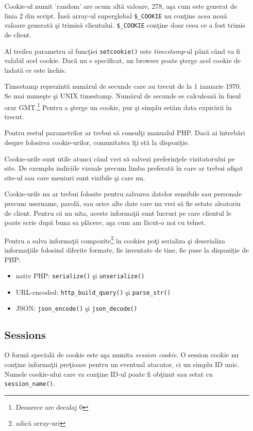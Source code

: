 Cookie-ul numit 'random' are acum altă valoare, 278, aşa cum este generat de linia 2 din script. \^Insă
array-ul superglobal \texttt{\$\_COOKIE} nu conţine acea nouă valoare generată şi trimisă
clientului. \texttt{\$\_COOKIE} conţine doar ceea ce a fost trimis de client.


Al treilea parametru al funcţiei \texttt{setcookie()} este \textsl{timestamp}-ul p\^ană
c\^and va fi valabil acel cookie. Dacă nu e specificat, un browser poate
şterge acel cookie de \^indată ce este \^inchis. 

Timestamp reprezintă numărul de secunde care au trecut de la 1 ianuarie 1970. Se mai numeşte
şi UNIX timestamp. Numărul de secunde se calculează \^in fusul orar GMT.\footnote{Deoarece
are decalaj 0} Pentru a şterge un cookie, pur şi simplu setăm data expirării \^in trecut.

Pentru restul parametrilor ar trebui să consulţi manualul PHP. Dacă ai \^intrebări
despre folosirea cookie-urilor, comunitatea {\phpro} \^iţi stă la dispoziţie.

Cookie-urile sunt utile atunci c\^and vrei să salvezi preferinţele vizitatorului
pe site. De exemplu indiciile vizuale precum limba preferată \^in care ar
trebui afişat site-ul sau care meniuri sunt vizibile şi care nu.

Cookie-urile nu ar trebui folosite pentru salvarea datelor sensibile sau personale
precum username, parolă, sau orice alte date care nu vrei să fie setate aleatoriu
de client. Pentru că nu uita, aceste informaţii sunt lucruri pe care
clientul le poate scrie după buna sa plăcere, aşa cum am făcut-o noi cu telnet.

Pentru a salva informaţii compozite\footnote{adică array-uri} \^in cookies
poţi serializa
şi deserializa informaţiile folosind diferite formate, fie inventate de tine,
fie puse la dispoziţie de PHP:
\begin{itemize}
 \item nativ PHP: \texttt{serialize()} şi \texttt{unserialize()}
 \item URL-encoded: \texttt{http\_build\_query()} şi \texttt{parse\_str()}
 \item JSON: \texttt{json\_encode()} şi \texttt{json\_decode()}
\end{itemize}


\subsection{Sessions}
O formă {\glqq}specială{\grqq} de cookie este aşa numita \textsl{session cookie}.
O session cookie nu conţine informaţii preţioase pentru un eventual atacator,
ci un simplu ID unic. Numele cookie-ului care va conţine ID-ul poate fi
obţinut sau setat cu \texttt{session\_name()}.

